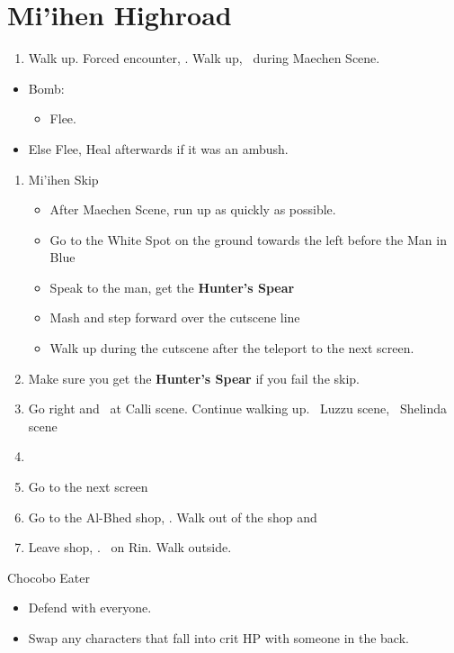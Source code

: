 \chapter{Mi'ihen Highroad}

\begin{enumerate}
	\item Walk up. Forced encounter, \sd. Walk up, \sd\ during Maechen Scene.
\end{enumerate}
\begin{encounters}
	\begin{itemize}
		\item Bomb:
		      \begin{itemize}
			      \kimahrif Lancet Bomb, learn \textbf{Self Destruct}
			      \item Flee.
		      \end{itemize}
		\item Else Flee,  Heal afterwards if it was an ambush.
	\end{itemize}
\end{encounters}
\begin{enumerate}[resume]
	\item {Mi'ihen Skip}
	      \begin{itemize}
		      \item After Maechen Scene, run up as quickly as possible.
		      \item Go to the White Spot on the ground towards the left before the Man in Blue
		      \item Speak to the man, get the \textbf{Hunter's Spear}
		      \item Mash and step forward over the cutscene line
		      \item Walk up during the cutscene after the teleport to the next screen.
	      \end{itemize}
	\item Make sure you get the \textbf{Hunter's Spear} if you fail the skip.
	\item Go right and \sd\ at Calli scene. Continue walking up. \sd\ Luzzu scene, \sd\ Shelinda scene
	\item \formation{\tidus}{\wakka}{\kimahri}
	\item Go to the next screen
	\item Go to the Al-Bhed shop, \sd. Walk out of the shop and \cs[5:30]
	\item Leave shop, \sd. \sd\ on Rin. Walk outside.
\end{enumerate}
\begin{battle}{Chocobo Eater}
	\begin{itemize}
		\tidusf Haste Boss
		\item Defend with everyone.
		\item Swap any characters that fall into crit HP with someone in the back.
	\end{itemize}
\end{battle}

